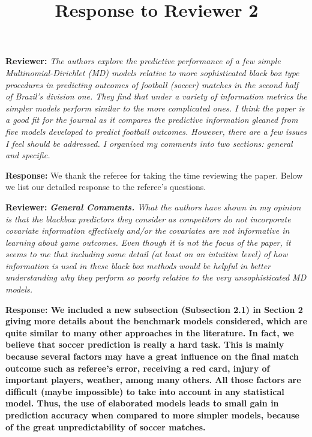 \documentclass[11pt]{article}
\title{Response to Reviewer 2}
\date{}
\begin{document}


\maketitle

\hspace{4mm} \textbf{Reviewer:} \textit{
    The authors explore the predictive performance of a few simple Multinomial-Dirichlet (MD)
    models relative to more sophisticated black box type procedures in predicting outcomes of
    football (soccer) matches in the second half of Brazil's division one. They find that under a
    variety of information metrics the simpler models perform similar to the more complicated ones.
    I think the paper is a good fit for the journal as it compares the predictive information gleaned
    from five models developed to predict football outcomes. However, there are a few issues I feel
    should be addressed. I organized my comments into two sections: general and specific.}

\vspace{2mm}
\textbf{Response:} We thank the referee for taking the time reviewing the paper. Below we list our detailed response to the referee's questions.\\

\vspace{6mm}

\hspace{4mm} \textbf{Reviewer:} \textit{\textbf{General Comments.}
    What the authors have shown in my opinion is that the blackbox predictors they consider as
    competitors do not incorporate covariate information effectively and/or the covariates are not
    informative in learning about game outcomes. Even though it is not the focus of the paper,
    it seems to me that including some detail (at least on an intuitive level) of how information is
    used in these black box methods would be helpful in better understanding why they perform so
    poorly relative to the very unsophisticated MD models.}

\vspace{2mm} \textbf{Response: We included a new subsection
(Subsection 2.1) in Section 2 giving more details about the
benchmark models considered, which are quite similar to many other
approaches in the literature. In fact, we believe that soccer
prediction is really a hard task. This is mainly because several
factors may have a great influence on the final match outcome such
as referee's error, receiving a red card, injury of important
players, weather, among many others. All those factors are difficult
(maybe impossible) to take into account in any statistical model.
Thus, the use of elaborated models leads to small gain in prediction
accuracy when compared to more simpler models, because of the great
unpredictability of soccer matches.}
\end{document}
